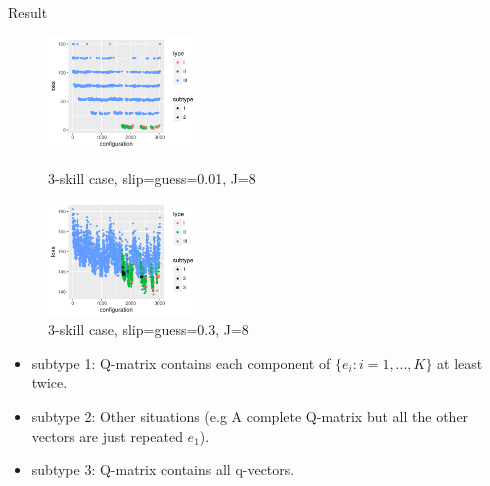 \documentclass[handout]{beamer}
\begin{document}
\begin{frame}{Result}
	\begin{figure}
		\begin{minipage}[b]{0.45\linewidth}
			\centering
			\includegraphics[width=4cm, height=3cm]{Figures/LossBestConfig_theta001_J8.pdf}
			\caption{3-skill case, slip=guess=0.01, J=8}
			\label{fig:Config-3}
		\end{minipage}
		\hfill
	    \begin{minipage}[b]{0.45\linewidth}
	    	\centering
			\includegraphics[width=4cm, height=3cm]{Figures/LossBestConfig_theta03_J8.pdf}
			\caption{3-skill case, slip=guess=0.3, J=8}
			\label{fig:Config-4}
	    \end{minipage}
	\end{figure}
\begin{itemize}
\item subtype 1: Q-matrix contains each component of $\{e_{i}:i=1,...,K\}$ at least twice. 
\item subtype 2: Other situations (e.g A complete Q-matrix but all the other vectors are just repeated $e_1$).
\item subtype 3: Q-matrix contains all q-vectors.
\end{itemize}
\end{frame}
\end{document}
